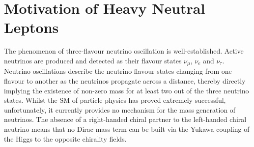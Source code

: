 \section{Motivation of Heavy Neutral Leptons}
\label{sec2Overview}



The phenomenon of three-flavour neutrino oscillation is well-established.
Active neutrinos are produced and detected as their flavour states $\nu_\mu$, $\nu_e$ and $\nu_\tau$.
Neutrino oscillations describe the neutrino flavour states changing from one flavour to another as the neutrinos propagate across a distance, thereby directly implying the existence of non-zero mass for at least two out of the three neutrino states.
Whilst the SM of particle physics has proved extremely successful, unfortunately, it currently provides no mechanism for the mass generation of neutrinos.
The absence of a right-handed chiral partner to the left-handed chiral neutrino means that no Dirac mass term can be built via the Yukawa coupling of the Higgs to the opposite chirality fields.

